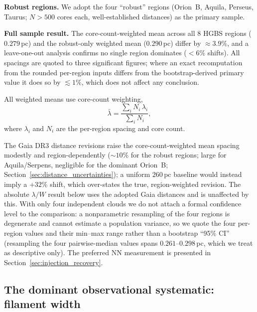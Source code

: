 \documentclass[usenatbib,twoside,twocolumn]{mnras}
\begin{document}
\textbf{Robust regions.} We adopt the four ``robust'' regions (Orion~B, Aquila, Perseus, Taurus; $N>500$ cores each, well-established distances) as the primary sample.

\textbf{Full sample result.} The core-count-weighted mean across all 8 HGBS regions ($0.279$\,pc) and the robust-only weighted mean ($0.290$\,pc) differ by $\approx3.9\%$, and a leave-one-out analysis confirms no single region dominates ($<6\%$ shifts). All spacings are quoted to three significant figures; where an exact recomputation from the rounded per-region inputs differs from the bootstrap-derived primary value it does so by $\lesssim1\%$, which does not affect any conclusion.

All weighted means use core-count weighting,
\begin{equation}
\bar{\lambda} = \frac{\sum_i N_i\,\lambda_i}{\sum_i N_i},
\label{eq:weighting}
\end{equation}
where $\lambda_i$ and $N_i$ are the per-region spacing and core count.

The Gaia DR3 distance revisions raise the core-count-weighted mean spacing modestly and region-dependently ($\sim10\%$ for the robust regions; large for Aquila/Serpens, negligible for the dominant Orion~B; Section~\ref{sec:distance_uncertainties}); a uniform $260$\,pc baseline would instead imply a $+32\%$ shift, which over-states the true, region-weighted revision. The absolute $\lambda/W$ result below uses the adopted Gaia distances and is unaffected by this. With only four independent clouds we do not attach a formal confidence level to the comparison: a nonparametric resampling of the four regions is degenerate and cannot estimate a population variance, so we quote the four per-region values and their min--max range rather than a bootstrap ``95\% CI'' (resampling the four pairwise-median values spans $0.261$--$0.298$\,pc, which we treat as descriptive only). The preferred NN measurement is presented in Section~\ref{sec:injection_recovery}.

\subsection{The dominant observational systematic: filament width}
\label{sec:widths}
\end{document}
